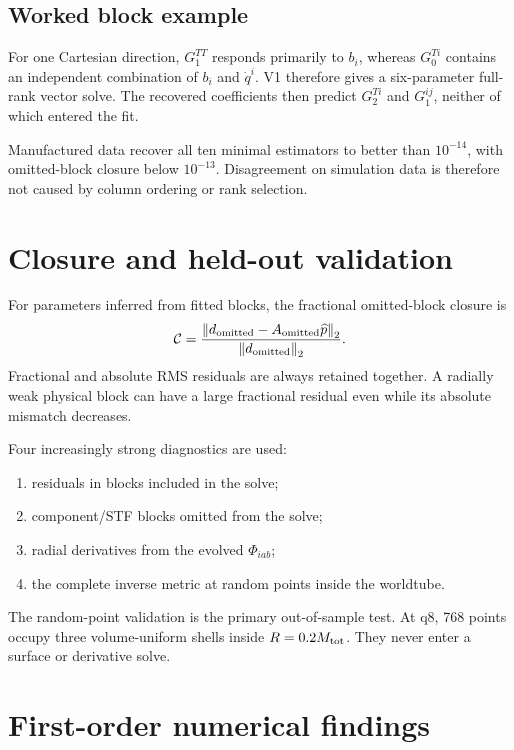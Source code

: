 \documentclass[11pt]{article}
\begin{document}
\subsection{Worked block example}

For one Cartesian direction, \(G^{TT}_{1}\) responds primarily to \(b_i\),
whereas \(G^{Ti}_{0}\) contains an independent combination of \(b_i\) and
\(\dot q^i\).  V1 therefore gives a six-parameter full-rank vector solve.
The recovered coefficients then predict \(G^{Ti}_{2}\) and
\(G^{ij}_{1}\), neither of which entered the fit.

Manufactured data recover all ten minimal estimators to better than
\(10^{-14}\), with omitted-block closure below \(10^{-13}\).  Disagreement on
simulation data is therefore not caused by column ordering or rank
selection.

\section{Closure and held-out validation}

For parameters inferred from fitted blocks, the fractional omitted-block
closure is
\begin{equation}
{\cal C}
=
\frac{
\left\|d_{\rm omitted}-A_{\rm omitted}\widehat p\right\|_2
}{
\left\|d_{\rm omitted}\right\|_2
}.
\end{equation}
Fractional and absolute RMS residuals are always retained together.  A
radially weak physical block can have a large fractional residual even while
its absolute mismatch decreases.

Four increasingly strong diagnostics are used:

\begin{enumerate}
  \item residuals in blocks included in the solve;
  \item component/STF blocks omitted from the solve;
  \item radial derivatives from the evolved \(\Phi_{iab}\);
  \item the complete inverse metric at random points inside the worldtube.
\end{enumerate}

The random-point validation is the primary out-of-sample test.  At q8, 768
points occupy three volume-uniform shells inside \(R=0.2M_{\rm tot}\).  They
never enter a surface or derivative solve.

\section{First-order numerical findings}
\end{document}

